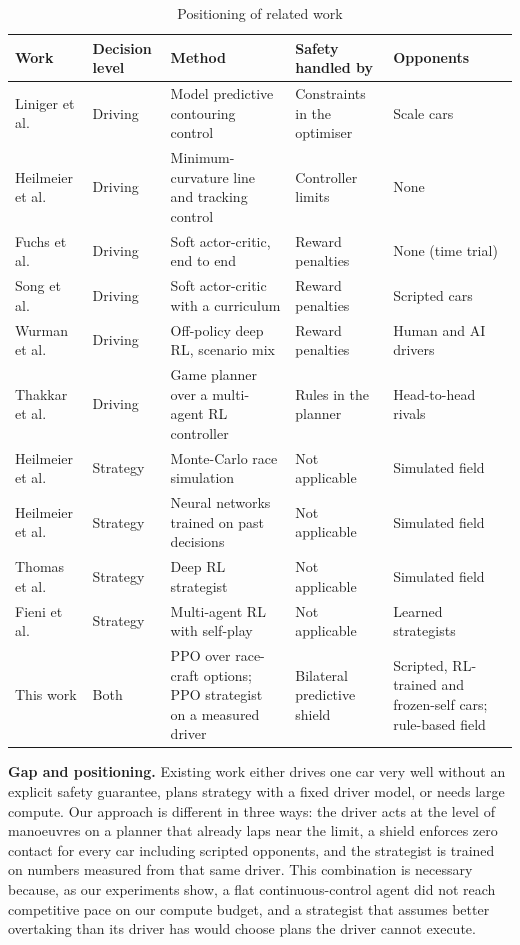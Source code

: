 \documentclass{ieeeaccess}
\begin{document}
\begin{table}[!t]
\caption{Positioning of related work}
\label{tab:1}
\centering\footnotesize
\begin{tabularx}{\textwidth}{>{\raggedright\arraybackslash}X>{\raggedright\arraybackslash}X>{\raggedright\arraybackslash}X>{\raggedright\arraybackslash}X>{\raggedright\arraybackslash}X}
\hline
\textbf{Work} & \textbf{Decision level} & \textbf{Method} & \textbf{Safety handled by} & \textbf{Opponents} \\
\hline
Liniger et al.~\cite{b11} & Driving & Model predictive contouring control & Constraints in the optimiser & Scale cars \\
Heilmeier et al.~\cite{b12} & Driving & Minimum-curvature line and tracking control & Controller limits & None \\
Fuchs et al.~\cite{b13} & Driving & Soft actor-critic, end to end & Reward penalties & None (time trial) \\
Song et al.~\cite{b19} & Driving & Soft actor-critic with a curriculum & Reward penalties & Scripted cars \\
Wurman et al.~\cite{b14} & Driving & Off-policy deep RL, scenario mix & Reward penalties & Human and AI drivers \\
Thakkar et al.~\cite{b20} & Driving & Game planner over a multi-agent RL controller & Rules in the planner & Head-to-head rivals \\
Heilmeier et al.~\cite{b8} & Strategy & Monte-Carlo race simulation & Not applicable & Simulated field \\
Heilmeier et al.~\cite{b10} & Strategy & Neural networks trained on past decisions & Not applicable & Simulated field \\
Thomas et al.~\cite{b27} & Strategy & Deep RL strategist & Not applicable & Simulated field \\
Fieni et al.~\cite{b28} & Strategy & Multi-agent RL with self-play & Not applicable & Learned strategists \\
This work & Both & PPO over race-craft options; PPO strategist on a measured driver & Bilateral predictive shield & Scripted, RL-trained and frozen-self cars; rule-based field \\
\hline
\end{tabularx}
\end{table}

\textbf{Gap and positioning.} Existing work either drives one car very well without an
explicit safety guarantee, plans strategy with a fixed driver model, or needs
large compute. Our approach is different in three ways: the driver acts at the
level of manoeuvres on a planner that already laps near the limit, a shield
enforces zero contact for every car including scripted opponents, and the
strategist is trained on numbers measured from that same driver. This combination
is necessary because, as our experiments show, a flat continuous-control agent did
not reach competitive pace on our compute budget, and a strategist that assumes
better overtaking than its driver has would choose plans the driver cannot execute.
\end{document}
